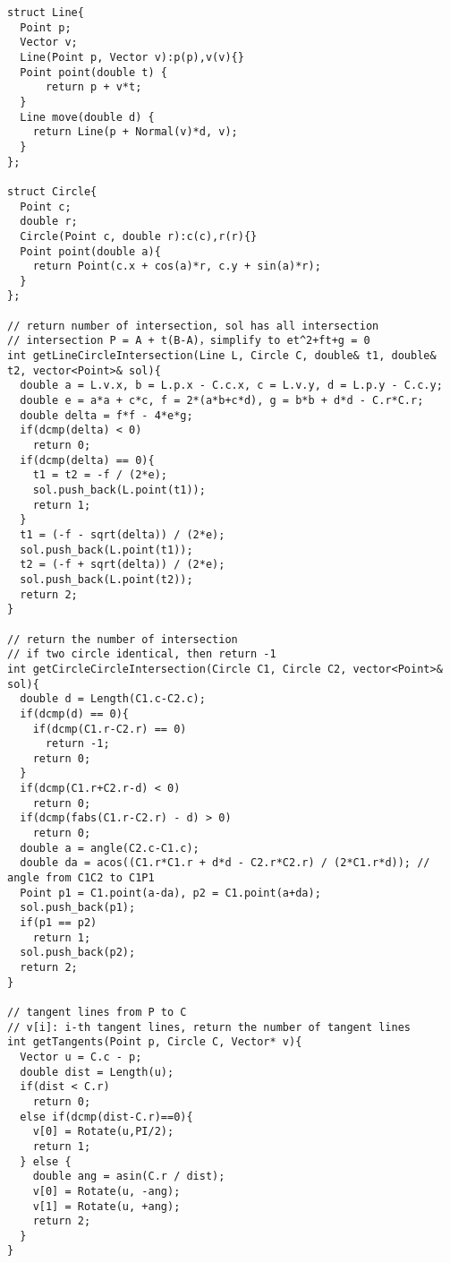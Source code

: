 \documentclass[10pt,landscape]{article}
\begin{document}
\begin{multicols}{2}
\begin{lstlisting}
struct Line{
  Point p;
  Vector v;
  Line(Point p, Vector v):p(p),v(v){}
  Point point(double t) {
      return p + v*t;
  }
  Line move(double d) {
    return Line(p + Normal(v)*d, v);
  }
};

struct Circle{
  Point c;
  double r;
  Circle(Point c, double r):c(c),r(r){}
  Point point(double a){
    return Point(c.x + cos(a)*r, c.y + sin(a)*r);
  }
};

// return number of intersection, sol has all intersection
// intersection P = A + t(B-A)，simplify to et^2+ft+g = 0
int getLineCircleIntersection(Line L, Circle C, double& t1, double& t2, vector<Point>& sol){
  double a = L.v.x, b = L.p.x - C.c.x, c = L.v.y, d = L.p.y - C.c.y;
  double e = a*a + c*c, f = 2*(a*b+c*d), g = b*b + d*d - C.r*C.r;
  double delta = f*f - 4*e*g;
  if(dcmp(delta) < 0)
    return 0;
  if(dcmp(delta) == 0){
    t1 = t2 = -f / (2*e);
    sol.push_back(L.point(t1));
    return 1;
  }
  t1 = (-f - sqrt(delta)) / (2*e);
  sol.push_back(L.point(t1));
  t2 = (-f + sqrt(delta)) / (2*e);
  sol.push_back(L.point(t2));
  return 2;
}

// return the number of intersection
// if two circle identical, then return -1
int getCircleCircleIntersection(Circle C1, Circle C2, vector<Point>& sol){
  double d = Length(C1.c-C2.c);
  if(dcmp(d) == 0){
    if(dcmp(C1.r-C2.r) == 0)
      return -1;
    return 0;
  }
  if(dcmp(C1.r+C2.r-d) < 0)
    return 0;
  if(dcmp(fabs(C1.r-C2.r) - d) > 0)
    return 0;
  double a = angle(C2.c-C1.c);
  double da = acos((C1.r*C1.r + d*d - C2.r*C2.r) / (2*C1.r*d)); // angle from C1C2 to C1P1
  Point p1 = C1.point(a-da), p2 = C1.point(a+da);
  sol.push_back(p1);
  if(p1 == p2)
    return 1;
  sol.push_back(p2);
  return 2;
}

// tangent lines from P to C
// v[i]: i-th tangent lines, return the number of tangent lines
int getTangents(Point p, Circle C, Vector* v){
  Vector u = C.c - p;
  double dist = Length(u);
  if(dist < C.r)
    return 0;
  else if(dcmp(dist-C.r)==0){
    v[0] = Rotate(u,PI/2);
    return 1;
  } else {
    double ang = asin(C.r / dist);
    v[0] = Rotate(u, -ang);
    v[1] = Rotate(u, +ang);
    return 2;
  }
}


\end{lstlisting}
\end{multicols}
\end{document}
